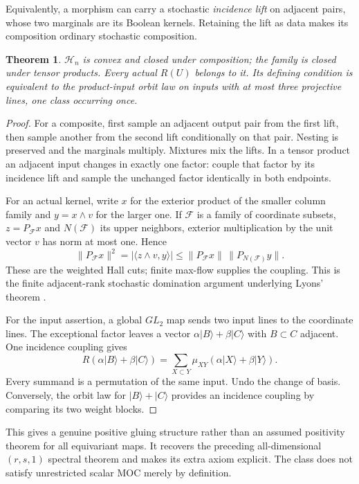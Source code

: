 \documentclass[11pt]{article}
\newtheorem{theorem}{Theorem}[section]\newtheorem{proposition}[theorem]{Proposition}
\begin{document}
Equivalently, a morphism can carry a stochastic \emph{incidence lift} on adjacent pairs, whose two marginals are its Boolean kernels. Retaining the lift as data makes its composition ordinary stochastic composition.

\begin{theorem}\label{incidence}
$\mathcal H_n$ is convex and closed under composition; the family is closed under tensor products. Every actual $R(U)$ belongs to it. Its defining condition is equivalent to the product-input orbit law on inputs with at most three projective lines, one class occurring once.
\end{theorem}
\begin{proof}
For a composite, first sample an adjacent output pair from the first lift, then sample another from the second lift conditionally on that pair. Nesting is preserved and the marginals multiply. Mixtures mix the lifts. In a tensor product an adjacent input changes in exactly one factor: couple that factor by its incidence lift and sample the unchanged factor identically in both endpoints.

For an actual kernel, write $x$ for the exterior product of the smaller column family and $y=x\wedge v$ for the larger one. If $\mathcal F$ is a family of coordinate subsets, $z=P_{\mathcal F}x$ and $N(\mathcal F)$ its upper neighbors, exterior multiplication by the unit vector $v$ has norm at most one. Hence
\[
\|P_{\mathcal F}x\|^2
 =|\langle z\wedge v,y\rangle|
 \le\|P_{\mathcal F}x\|\,\|P_{N(\mathcal F)}y\|.
\]
These are the weighted Hall cuts; finite max-flow supplies the coupling. This is the finite adjacent-rank stochastic domination argument underlying Lyons' theorem \cite{lyons}.

For the input assertion, a global $GL_2$ map sends two input lines to the coordinate lines. The exceptional factor leaves a vector $\alpha|B\rangle+\beta|C\rangle$ with $B\subset C$ adjacent. One incidence coupling gives
\[
R(\alpha|B\rangle+\beta|C\rangle)
 =\sum_{X\subset Y}\mu_{XY}(\alpha|X\rangle+\beta|Y\rangle).
\]
Every summand is a permutation of the same input. Undo the change of basis. Conversely, the orbit law for $|B\rangle+|C\rangle$ provides an incidence coupling by comparing its two weight blocks.
\end{proof}

This gives a genuine positive gluing structure rather than an assumed positivity theorem for all equivariant maps. It recovers the preceding all-dimensional $(r,s,1)$ spectral theorem and makes its extra axiom explicit. The class does not satisfy unrestricted scalar MOC merely by definition.
\end{document}
